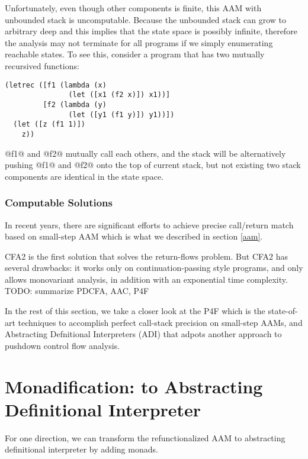 \documentclass[acmsmall,review,anonymous]{acmart}\settopmatter{printfolios=true,printccs=false,printacmref=false}
\begin{document}
Unfortunately, even though other components is finite, this AAM with unbounded stack is uncomputable. 
Because the unbounded stack can grow to arbitrary deep and this implies that the state space is possibly 
infinite, therefore the analysis may not terminate for all programs if we simply enumerating 
reachable states.
To see this, consider a program that has two mutually recursived functions:

\begin{lstlisting}
(letrec ([f1 (lambda (x) 
               (let ([x1 (f2 x)]) x1))]
         [f2 (lambda (y)
               (let ([y1 (f1 y)]) y1))])
  (let ([z (f1 1)])
    z))
\end{lstlisting}

@f1@ and @f2@ mutually call each others, and the stack will be alternatively
pushing @f1@ and @f2@ onto the top of current stack, but not existing 
two stack components are identical in the state space.

\subsubsection{Computable Solutions}

In recent years, there are significant efforts \cite{vardoulakis2010cfa2, earl2012introspective, 
gilray2016pushdown, johnson2015abstracting} to achieve precise call/return 
match based on small-step AAM which is what we described in section \ref{aam}.

CFA2 is the first solution that solves the return-flows problem\cite{vardoulakis2010cfa2}.
But CFA2 has several drawbacks: it works only on continuation-passing style programs, 
and only allows monovariant analysis, in addition with an exponential time complexity.
TODO: summarize PDCFA, AAC, P4F

In the rest of this section, we take a closer look at the P4F which is the
state-of-art techniques to accomplish perfect call-stack precision on small-step
AAMs, and Abstracting Defnitional Interpreters (ADI) that adpots another 
approach to pushdown control flow analysis.

\section{Monadification: to Abstracting Definitional Interpreter}

For one direction, we can transform the refunctionalized AAM to abstracting definitional interpreter
by adding monads.
\end{document}
